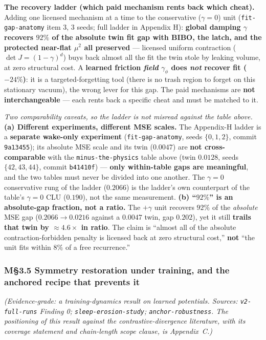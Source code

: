 \documentclass[10pt]{article}
\begin{document}
\textbf{The recovery ladder (which paid mechanism rents back which cheat).} Adding one licensed mechanism at a time to the conservative ($\gamma=0$) unit (\texttt{fit-gap-anatomy} item 3, $3$ seeds; full ladder in Appendix H): \textbf{global damping $\gamma$ recovers $92\%$ of the absolute twin fit gap with BIBO, the latch, and the protected near-flat $\mu^2$ all preserved} --- licensed uniform contraction ($\det J=(1-\gamma)^d$) buys back almost all the fit the twin stole by leaking volume, at zero structural cost. A \textbf{learned friction \emph{field} $\gamma_\phi$ does \emph{not} recover fit ($-24\%$)}: it is a targeted-forgetting tool (there is no trash region to forget on this stationary vacuum), the wrong lever for this gap. The paid mechanisms are \textbf{not interchangeable} --- each rents back a specific cheat and must be matched to it.

\emph{Two comparability caveats, so the ladder is not misread against the table above.} \textbf{(a) Different experiments, different MSE scales.} The Appendix-H ladder is a \textbf{separate wake-only experiment} (\texttt{fit-gap-anatomy}, seeds $\{0,1,2\}$, commit \texttt{9a13455}); its absolute MSE scale and its twin ($0.0047$) are \textbf{not cross-comparable} with the \texttt{minus-the-physics} table above (twin $0.0128$, seeds $\{42,43,44\}$, commit \texttt{b41410f}) --- \textbf{only within-table gaps are meaningful}, and the two tables must never be divided into one another. The $\gamma=0$ conservative rung of the ladder ($0.2066$) is the ladder's own counterpart of the table's $\gamma=0$ CLU ($0.190$), not the same measurement. \textbf{(b) ``$92\%$'' is an absolute-gap fraction, not a ratio.} The $+\gamma$ unit recovers $92\%$ of the \emph{absolute} MSE gap ($0.2066\to0.0216$ against a $0.0047$ twin, gap $0.202$), yet it still \textbf{trails that twin by $\approx4.6\times$ in ratio}. The claim is ``almost all of the absolute contraction-forbidden penalty is licensed back at zero structural cost,'' \textbf{not} ``the unit fits within $8\%$ of a free recurrence.''

\subsubsection*{M\S3.5 Symmetry restoration under training, and the anchored recipe that prevents it}

\emph{(Evidence-grade: a training-dynamics result on learned potentials. Sources: \texttt{v2-full-runs} Finding 0; \texttt{sleep-erosion-study}; \texttt{anchor-robustness}. The positioning of this result against the contrastive-divergence literature, with its coverage statement and chain-length scope clause, is Appendix~C.)}
\end{document}
